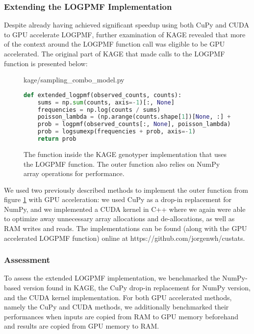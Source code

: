 \subsubsection{Extending the LOGPMF Implementation}
Despite already having achieved significant speedup using both CuPy and CUDA to GPU accelerate LOGPMF, further examination of KAGE revealed that more of the context around the LOGPMF function call was eligible to be GPU accelerated.
The original part of KAGE that made calls to the LOGPMF function is presented below:
\begin{figure}[H] 
\begin{center}
kage/sampling\_combo\_model.py
\end{center}
\begin{lstlisting}[language=Python,style=pycode]
def extended_logpmf(observed_counts, counts):
    sums = np.sum(counts, axis=-1)[:, None]
    frequencies = np.log(counts / sums)
    poisson_lambda = (np.arange(counts.shape[1])[None, :] + ERROR_RATE) * BASE_LAMBDA 
    prob = logpmf(observed_counts[:, None], poisson_lambda) # LOGPMF call is made here
    prob = logsumexp(frequencies + prob, axis=-1)
    return prob
\end{lstlisting}
\caption{
  The function inside the KAGE genotyper implementation that uses the LOGPMF function.
  The outer function also relies on NumPy array operations for performance.
}
\label{methods:gpu_accelerating_genotyping:figures:extended_logpmf_context}
\end{figure}

We used two previously described methods to implement the outer function from figure \ref{methods:gpu_accelerating_genotyping:figures:extended_logpmf_context} with GPU acceleration: we used CuPy as a drop-in replacement for NumPy, and we implemented a CUDA kernel in C++ where we again were able to optimize away unnecessary array allocations and de-allocations, as well as RAM writes and reads.
The implementations can be found (along with the GPU accelerated LOGPMF function) online at \url{}https://github.com/jorgenwh/custats.

\subsubsection{Assessment}
To assess the extended LOGPMF implementation, we benchmarked the NumPy-based version found in KAGE, the CuPy drop-in replacement for NumPy version, and the CUDA kernel implementation.
For both GPU accelerated methods, namely the CuPy and CUDA methods, we additionally benchmarked their performances when inputs are copied from RAM to GPU memory beforehand and results are copied from GPU memory to RAM.

